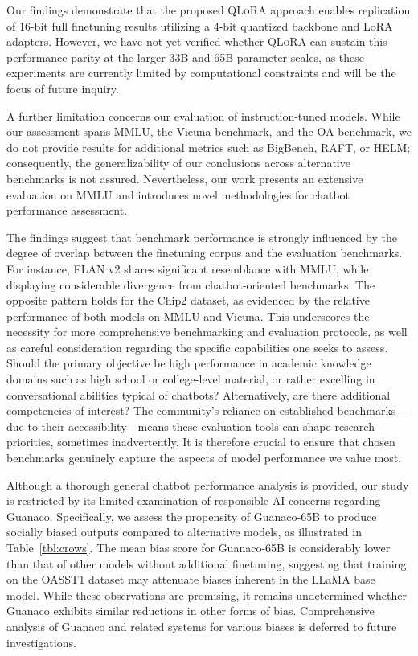 Our findings demonstrate that the proposed \textsc{QLoRA} approach enables replication of 16-bit full finetuning results utilizing a 4-bit quantized backbone and LoRA adapters. However, we have not yet verified whether \textsc{QLoRA} can sustain this performance parity at the larger 33B and 65B parameter scales, as these experiments are currently limited by computational constraints and will be the focus of future inquiry.

A further limitation concerns our evaluation of instruction-tuned models. While our assessment spans MMLU, the Vicuna benchmark, and the OA benchmark, we do not provide results for additional metrics such as BigBench, RAFT, or HELM; consequently, the generalizability of our conclusions across alternative benchmarks is not assured. Nevertheless, our work presents an extensive evaluation on MMLU and introduces novel methodologies for chatbot performance assessment.

The findings suggest that benchmark performance is strongly influenced by the degree of overlap between the finetuning corpus and the evaluation benchmarks. For instance, FLAN v2 shares significant resemblance with MMLU, while displaying considerable divergence from chatbot-oriented benchmarks. The opposite pattern holds for the Chip2 dataset, as evidenced by the relative performance of both models on MMLU and Vicuna. This underscores the necessity for more comprehensive benchmarking and evaluation protocols, as well as careful consideration regarding the specific capabilities one seeks to assess. Should the primary objective be high performance in academic knowledge domains such as high school or college-level material, or rather excelling in conversational abilities typical of chatbots? Alternatively, are there additional competencies of interest? The community’s reliance on established benchmarks—due to their accessibility—means these evaluation tools can shape research priorities, sometimes inadvertently. It is therefore crucial to ensure that chosen benchmarks genuinely capture the aspects of model performance we value most.

Although a thorough general chatbot performance analysis is provided, our study is restricted by its limited examination of responsible AI concerns regarding {Guanaco}. Specifically, we assess the propensity of {Guanaco}-65B to produce socially biased outputs compared to alternative models, as illustrated in Table~\ref{tbl:crows}. The mean bias score for {Guanaco}-65B is considerably lower than that of other models without additional finetuning, suggesting that training on the OASST1 dataset may attenuate biases inherent in the LLaMA base model. While these observations are promising, it remains undetermined whether {Guanaco} exhibits similar reductions in other forms of bias. Comprehensive analysis of {Guanaco} and related systems for various biases is deferred to future investigations.

